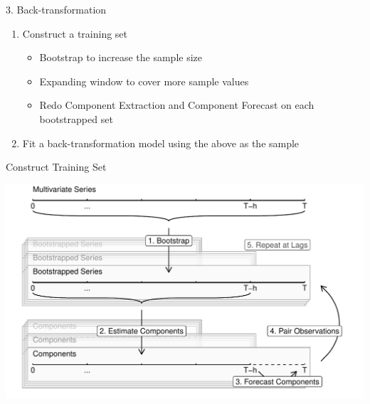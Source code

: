 \documentclass[14pt,ignorenonframetext,]{beamer}
\providecommand{\tightlist}{%
  \setlength{\itemsep}{0pt}\setlength{\parskip}{0pt}}
\begin{document}
\begin{frame}{3. Back-transformation}
\protect\hypertarget{back-transformation}{}
\begin{enumerate}
\tightlist
\item
  Construct a training set

  \begin{itemize}
  \tightlist
  \item
    Bootstrap to increase the sample size
  \item
    Expanding window to cover more sample values
  \item
    Redo Component Extraction and Component Forecast on each
    bootstrapped set
  \end{itemize}
\item
  Fit a back-transformation model using the above as the sample
\end{enumerate}
\end{frame}

\begin{frame}{Construct Training Set}
\protect\hypertarget{construct-training-set}{}
\begin{center}
\includegraphics[width=\linewidth]{plot/p_backtransform}
\end{center}
\end{frame}
\end{document}
